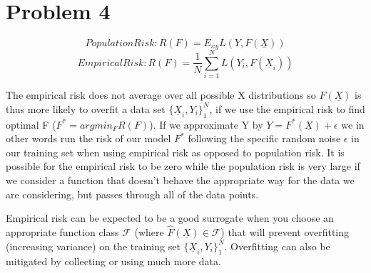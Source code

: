 \documentclass[11pt]{article}
\begin{document}
\begin{center}

\ \\
\end{center}

\section*{Problem 4}

$$Population Risk: R(F) = E_{xy}L(Y,F(\underline{X}))$$
$$ Empirical Risk: R(F) = \frac{1}{N}\sum_{i=1}^NL(Y_i, F(\underline{X}_i))$$ 

The empirical risk does not average over all possible X distributions so $F(\underline{X})$ is thus more likely to overfit a data set $\{\underline{X}_i, Y_i\}_1^N$, if we use the empirical risk to find optimal F ($F^* = argmin_FR(F)$). If we approximate Y by $Y=F^*(\underline{X}) + \epsilon$ we in other words run the risk of our model $F^*$ following the specific random noise $\epsilon$ in our training set when using empirical risk as opposed to population risk. It is possible for the empirical risk to be zero while the population risk is very large if we consider a function that doesn't behave the appropriate way for the data we are considering, but passes through all of the  data points. 

Empirical risk can be expected to be a good surrogate when you choose an appropriate function class $\mathscr{F}$ (where $\hat{F}(\underline{X}) \in \mathscr{F}$) that will prevent overfitting (increasing variance) on the training set $\{\underline{X}_i, Y_i\}_1^N$. Overfitting can also be mitigated by collecting or using much more data. 
\end{document}
